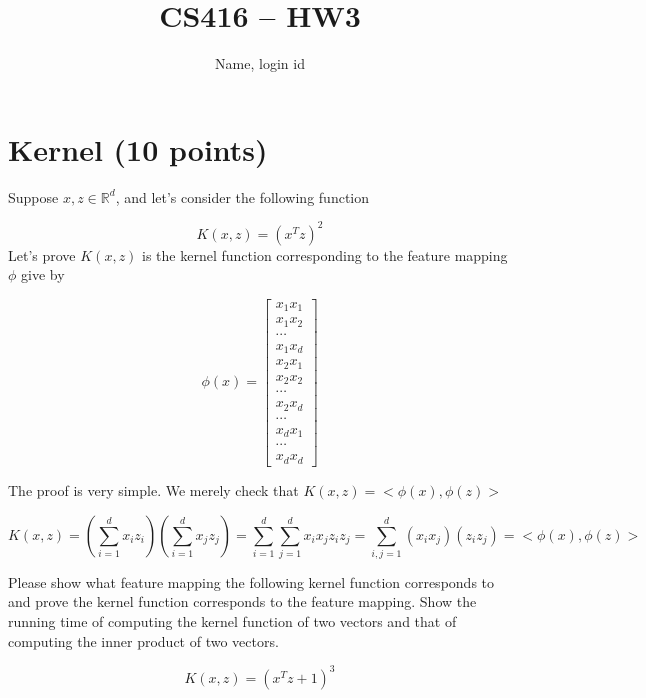 \documentclass{article}
\title{CS416 -- HW3}
\author{Name, login id}
\date{}
\begin{document}
\maketitle

\section{Kernel (10 points)}
Suppose $x,z\in \mathbb{R}^d$, and let's consider the following function

$$K(x,z)=(x^T z)^2
$$
Let's prove $K(x,z)$ is the kernel function corresponding to the feature mapping $\phi$ give by 

$$
\phi(x)=
\begin{bmatrix}
x_1x_1\\
x_1x_2\\
\cdots\\
x_1x_d\\
x_2x_1\\
x_2x_2\\
\cdots\\
x_2x_d\\
\cdots\\
x_dx_1\\
\cdots\\
x_dx_d
\end{bmatrix}
$$

The proof is very simple. We merely check that $K(x,z)=<\phi(x), \phi(z)>$

$$
K(x,z) = (\sum^d_{i=1}x_i z_i) (\sum^d_{i=1}x_j z_j)
=\sum^d_{i=1}\sum^d_{j=1}x_ix_jz_iz_j=\sum^d_{i,j=1} (x_ix_j)(z_iz_j)=<\phi(x), \phi(z)>
$$

Please show what feature mapping the  following kernel function corresponds to and prove the kernel function corresponds to the feature mapping. Show the running time of computing the kernel function of two vectors and that of computing the inner product of two vectors.  

$$
K(x,z)=(x^T z+1)^3
$$
\end{document}
